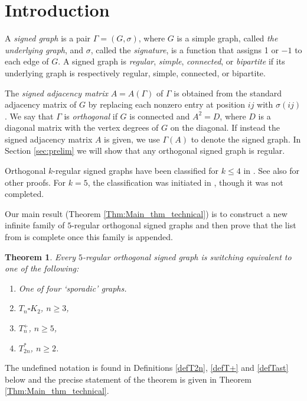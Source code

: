 \documentclass[11pt]{article}
\theoremstyle{plain}
\newtheorem{theorem}{Theorem}[section]
\theoremstyle{definition}
\begin{document}
\section{Introduction}
A {\sl signed graph}  is a pair $\Gamma=(G, \sigma)$, where $G$ is a simple graph,  called {\sl the underlying graph}, and $\sigma$,
 called the {\sl  signature}, is a function that assigns 1 or $-1$  to each edge of $G$. A signed graph is \textit{regular}, \textit{simple}, \textit{connected}, or \textit{bipartite} if its underlying graph is respectively regular, simple, connected, or bipartite.

 
The {\sl signed adjacency matrix} $A=A(\Gamma)$ of  $\Gamma$ is obtained from the standard adjacency matrix of $G$ by replacing each nonzero entry at position $ij$ with $\sigma(ij)$.
 We say that $\Gamma$  is {\sl orthogonal }  if $G$ is connected and $A^2=D$, where  $D$ is a diagonal matrix with the vertex degrees of $G$ on the diagonal. If instead the signed adjacency matrix $A$ is given, we use $\Gamma(A)$ to denote the signed graph. In Section \ref{sec:prelim} we will show that any orthogonal signed graph is regular.

Orthogonal $k$-regular signed  graphs have been classified  for $k\leqslant4$ in \cite{MK}. See also \cite{Gh,Ho} for other proofs.  For $k=5$, the classification was initiated in \cite{St}, though it was not completed. 

Our main result (Theorem \ref{Thm:Main_thm_technical}) is to construct a new infinite family of $5$-regular orthogonal signed graphs and then prove that the list from \cite{St} is complete once this family is appended. 



\begin{theorem} \label{Thm:Main_thm_colloquial}
Every $5$-regular orthogonal signed graph is switching equivalent to one of the following: 

\begin{enumerate}
    \item One of four `sporadic' graphs.
    \item $T_n\square K_2$, $n\geqslant3$,
    \item $T_n^+$, $n\geqslant 5$,
    \item $T_{2n}^{\ast}$, $n\geqslant 2$.
\end{enumerate}
\end{theorem}

The undefined notation is found in Definitions  \ref{defT2n}, \ref{defT+} and \ref{defTast} below and the precise statement of the theorem is given in Theorem \ref{Thm:Main_thm_technical}.
\end{document}
